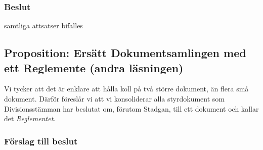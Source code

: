 \documentclass[protokoll]{dvd}
\begin{document}
\subsubsection*{Beslut}
    \begin{attsatser}
        \item samtliga attsatser bifalles
    \end{attsatser}

\newpage
\subsection{Proposition: Ersätt Dokumentsamlingen med ett Reglemente (andra läsningen)}

Vi tycker att det är enklare att hålla koll på två större dokument, än flera små dokument.
Därför föreslår vi att vi konsoliderar alla styrdokument som Divisionsstämman har beslutat om, förutom Stadgan, till ett dokument och kallar det \emph{Reglementet}.

\subsubsection*{Förslag till beslut}
\end{document}
